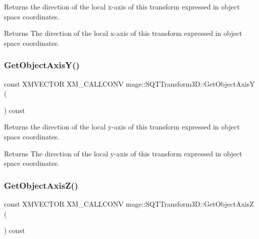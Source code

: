 Returns the direction of the local x-\/axis of this transform expressed in object space coordinates.

\begin{DoxyReturn}{Returns}
The direction of the local x-\/axis of this transform expressed in object space coordinates. 
\end{DoxyReturn}
\mbox{\label{classmage_1_1_s_q_t_transform3_d_aca6a1da4ac8033de379d3932baad7020}} 
\subsubsection{\texorpdfstring{Get\+Object\+Axis\+Y()}{GetObjectAxisY()}}
{\footnotesize\ttfamily const X\+M\+V\+E\+C\+T\+OR X\+M\+\_\+\+C\+A\+L\+L\+C\+O\+NV mage\+::\+S\+Q\+T\+Transform3\+D\+::\+Get\+Object\+AxisY (\begin{DoxyParamCaption}{ }\end{DoxyParamCaption}) const\hspace{0.3cm}{\ttfamily [noexcept]}}

Returns the direction of the local y-\/axis of this transform expressed in object space coordinates.

\begin{DoxyReturn}{Returns}
The direction of the local y-\/axis of this transform expressed in object space coordinates. 
\end{DoxyReturn}
\mbox{\label{classmage_1_1_s_q_t_transform3_d_a1869c1d838df41dc6a7cf07b72dd9100}} 
\subsubsection{\texorpdfstring{Get\+Object\+Axis\+Z()}{GetObjectAxisZ()}}
{\footnotesize\ttfamily const X\+M\+V\+E\+C\+T\+OR X\+M\+\_\+\+C\+A\+L\+L\+C\+O\+NV mage\+::\+S\+Q\+T\+Transform3\+D\+::\+Get\+Object\+AxisZ (\begin{DoxyParamCaption}{ }\end{DoxyParamCaption}) const\hspace{0.3cm}{\ttfamily [noexcept]}}

